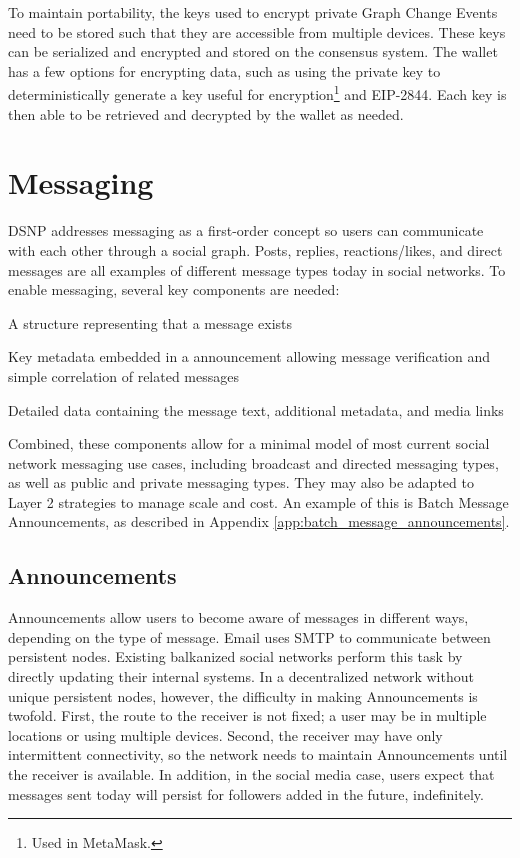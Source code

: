 \documentclass[12pt,letterpaper]{article}
\providecommand{\tightlist}{%
\setlength{\itemsep}{0pt}\setlength{\parskip}{0pt}}
\begin{document}
To maintain portability, the keys used to encrypt private Graph Change Events need to be
stored such that they are accessible from multiple devices. These keys can be serialized and
encrypted and stored on the consensus system. The wallet has a few options for encrypting
data, such as using the private key to deterministically generate a key useful for
encryption\footnote{Used in MetaMask.\cite{metamask_doc}} and EIP-2844.\cite{eip2844} Each
key is then able to be retrieved and decrypted by the wallet as needed.

\section{Messaging}\label{sec:messaging}

DSNP addresses messaging as a first-order concept so users can communicate with each other
through a social graph. Posts, replies, reactions/likes, and direct messages are all
examples of different message types today in social networks. To enable messaging, several
key components are needed:

\begin{samepage}
	\begin{description}
		\tightlist
		\item[Announcement:]
		      A structure representing that a message exists
		\item[Announcement Metadata:]
		      Key metadata embedded in a announcement allowing
		      message verification and simple correlation of related messages
		\item[Content:]
		      Detailed data containing the message text, additional metadata, and media links
	\end{description}
\end{samepage}

Combined, these components allow for a minimal model of most current social network
messaging use cases, including broadcast and directed messaging types, as well as public and
private messaging types. They may also be adapted to Layer 2 strategies to manage scale and
cost. An example of this is Batch Message Announcements, as described in Appendix
\ref{app:batch_message_announcements}.

\subsection{Announcements}\label{sec:announcements}

Announcements allow users to become aware of messages in different ways, depending on the
type of message. Email uses SMTP to communicate between persistent nodes. Existing
balkanized social networks perform this task by directly updating their internal systems.
In a decentralized network without unique persistent nodes, however, the difficulty in
making Announcements is twofold. First, the route to the receiver is not fixed; a user may
be in multiple locations or using multiple devices. Second, the receiver may have only
intermittent connectivity, so the network needs to maintain Announcements until the receiver
is available. In addition, in the social media case, users expect that messages sent today
will persist for followers added in the future, indefinitely.
\end{document}
